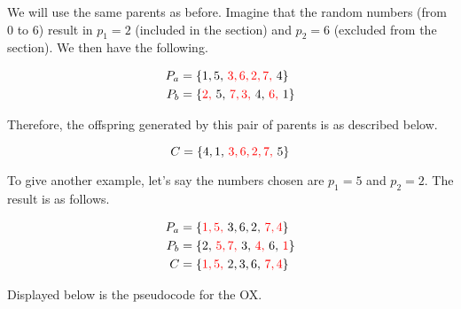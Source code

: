 We will use the same parents as before. Imagine that the random numbers (from $0$ to $6$) result in $p_{1} = 2$ (included in the section) and $p_{2} = 6$ (excluded from the section). We then have the following.

\begin{align}
    P_{a} &= \color{black}{ \{ 1, 5,\ } \color{red}{3, 6, 2, 7,\ } \color{black}{4} \}\\
    P_{b} &= \color{black}{\{} \color{red}{2,\ } \color{black}{5,\ } \color{red}{7, 3,\ } \color{black}{4,\ } \color{red}{6,\ } \color{black}{1} \}
\end{align}

Therefore, the offspring generated by this pair of parents is as described below.

\begin{equation}
    C = \color{black}{\{ 4, 1,\ } \color{red}{3, 6, 2, 7,\ } \color{black}{5 \}}
\end{equation}

To give another example, let's say the numbers chosen are $p_{1} = 5$ and $p_{2} = 2$. The result is as follows.

\begin{align}
    P_{a} &= \color{black}{\{} \color{red}{1, 5,\ } \color{black}{3, 6, 2,\ } \color{red}{7, 4} \color{black}{\}}\\
    P_{b} &= \color{black}{\{ 2,\ } \color{red}{5, 7,\ } \color{black}{3,\ } \color{red}{4,\ } \color{black}{6,\ } \color{red}{1} \color{black}{\}}\\
    C &= \color{black}{\{} \color{red}{1, 5,\ } \color{black}{2, 3, 6,\ } \color{red}{7, 4} \color{black}{\}}
\end{align}

Displayed below is the pseudocode for the OX.


